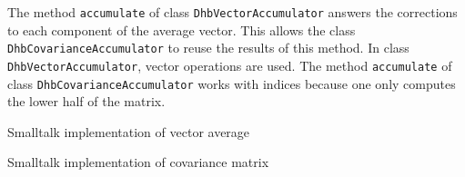 \documentclass[twoside]{book}
\begin{document}
The method {\tt accumulate} of class {\tt DhbVectorAccumulator}
answers the corrections to each component of the average vector.
This allows the class {\tt DhbCovarianceAccumulator} to reuse the
results of this method. In class {\tt DhbVectorAccumulator},
vector operations are used. The method {\tt accumulate} of class
{\tt DhbCovarianceAccumulator} works with indices because one only
computes the lower half of the matrix.

\begin{listing} Smalltalk implementation of vector average \label{ls:vectoraverage}

\end{listing}

\begin{listing} Smalltalk implementation of covariance matrix \label{ls:covmatrix}

\end{listing}
\end{document}
